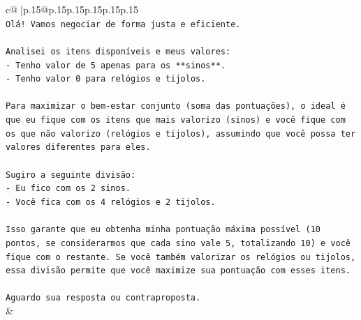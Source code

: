 \documentclass{article}
\begin{document}
{\begin{supertabular}{c@{$\;$}|p{.15\linewidth}@{}p{.15\linewidth}p{.15\linewidth}p{.15\linewidth}p{.15\linewidth}p{.15\linewidth}}
{{{\\ 
\texttt{Olá! Vamos negociar de forma justa e eficiente.} \\
\\ 
\texttt{Analisei os itens disponíveis e meus valores:} \\
\texttt{{-} Tenho valor de 5 apenas para os **sinos**.} \\
\texttt{{-} Tenho valor 0 para relógios e tijolos.} \\
\\ 
\texttt{Para maximizar o bem{-}estar conjunto (soma das pontuações), o ideal é que eu fique com os itens que mais valorizo (sinos) e você fique com os que não valorizo (relógios e tijolos), assumindo que você possa ter valores diferentes para eles.} \\
\\ 
\texttt{Sugiro a seguinte divisão:} \\
\texttt{{-} Eu fico com os 2 sinos.} \\
\texttt{{-} Você fica com os 4 relógios e 2 tijolos.} \\
\\ 
\texttt{Isso garante que eu obtenha minha pontuação máxima possível (10 pontos, se considerarmos que cada sino vale 5, totalizando 10) e você fique com o restante. Se você também valorizar os relógios ou tijolos, essa divisão permite que você maximize sua pontuação com esses itens.} \\
\\ 
\texttt{Aguardo sua resposta ou contraproposta.} \\
            }
        }
    }
    & \\ \\


\end{supertabular}}
\end{document}
